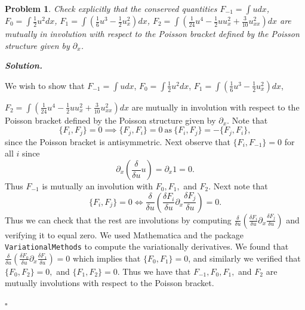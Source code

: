 \documentclass[12pt]{report}
\newtheorem{problem}{Problem}
\newenvironment{solution}[1][\it{Solution}]{\textbf{#1. } }{$\square$}
\newcommand{\paren}[1]{{\left(#1\right)}} %
\begin{document}
\newpage



\begin{problem}
    Check explicitly that the conserved quantities $F_{-1}=\int u dx$,
$F_0=\int \frac{1}{2} u^2 dx$,
$F_1=\int\left(\frac{1}{6}u^3-\frac{1}{2}u_x^2\right) dx$, $F_2=\int
\left(\frac{1}{24}u^4-\frac{1}{2}uu_x^2+\frac{3}{10}u_{xx}^2\right)dx$ are
mutually in involution with respect to the Poisson bracket defined by the
Poisson structure given by $\partial_x$.
\end{problem}

\begin{solution}

    \noindent
    We wish to show that $F_{-1}=\int u dx$,
    $F_0=\int \frac{1}{2} u^2 dx$,
    $F_1=\int\left(\frac{1}{6}u^3-\frac{1}{2}u_x^2\right) dx$, 
    
    \noindent
    $F_2=\int \left(\frac{1}{24}u^4-\frac{1}{2}uu_x^2+\frac{3}{10}u_{xx}^2\right)dx$ are mutually in involution with respect to the Poisson bracket defined by the Poisson structure given by $\partial_x$. Note that
    \[ \{F_i,F_j\} = 0 \implies \{F_j,F_i\} = 0 ~\text{as}~\{F_i,F_j\} = - \{F_j,F_i\},\]
    since the Poisson bracket is antisymmetric.
    Next observe that $\{F_i,F_{-1}\} = 0$ for all $i$ since 
    \[ \partial_x(\frac{\delta}{\delta u}u) = \partial_x 1 = 0.\]
    Thus $F_{-1}$ is mutually an involution with $F_0,F_1,$ and $F_2$.
    Next note that 
    \[\{F_i,F_j\} =0 \iff \frac{\delta}{\delta u}\paren{\frac{\delta F_i}{\delta u} \partial_x \frac{\delta F_j}{\delta u}} = 0.\]
    Thus we can check that the rest are involutions by computing $\frac{\delta}{\delta u}\paren{\frac{\delta F_i}{\delta u} \partial_x \frac{\delta F_j}{\delta u}}$ and verifying it to equal zero. We used Mathematica and the package \verb+VariationalMethods+ to compute the variationally derivatives. We found that $\frac{\delta}{\delta u}\paren{\frac{\delta F_0}{\delta u} \partial_x \frac{\delta F_1}{\delta u}} = 0$ which implies that $\{F_0,F_1\} = 0$, and similarly we verified that $\{F_0,F_2\} = 0,$ and $\{F_1,F_2\} = 0.$ Thus we have that $F_{-1},F_0,F_1,$ and $F_2$ are mutually involutions with respect to the Poisson bracket.

\end{solution}
\end{document}
